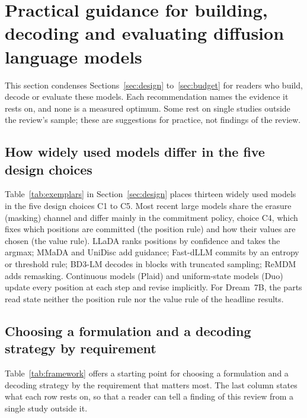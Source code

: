\section{Practical guidance for building, decoding and evaluating diffusion language models}
\label{sec:practice}

This section condenses Sections~\ref{sec:design} to~\ref{sec:budget} for readers who build, decode or evaluate these models. Each recommendation names the evidence it rests on, and none is a measured optimum. Some rest on single studies outside the review's sample; these are suggestions for practice, not findings of the review.

\subsection{How widely used models differ in the five design choices}
\label{sec:practice-exemplars}

Table~\ref{tab:exemplars} in Section~\ref{sec:design} places thirteen widely used models in the five design choices C1 to C5. Most recent large models share the erasure (masking) channel and differ mainly in the commitment policy, choice C4, which fixes which positions are committed (the position rule) and how their values are chosen (the value rule). LLaDA ranks positions by confidence and takes the argmax; MMaDA and UniDisc add guidance; Fast-dLLM commits by an entropy or threshold rule; BD3-LM decodes in blocks with truncated sampling; ReMDM adds remasking. Continuous models (Plaid) and uniform-state models (Duo) update every position at each step and revise implicitly. For Dream~7B, the parts read state neither the position rule nor the value rule of the headline results.

\subsection{Choosing a formulation and a decoding strategy by requirement}
\label{sec:practice-framework}
Table~\ref{tab:framework} offers a starting point for choosing a formulation and a decoding strategy by the requirement that matters most. The last column states what each row rests on, so that a reader can tell a finding of this review from a single study outside it.

